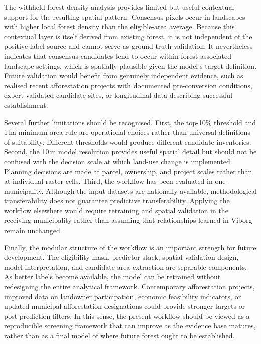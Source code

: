 \documentclass[land,article,submit,moreauthors]{Definitions/mdpi}
\begin{document}
The withheld forest-density analysis provides limited but useful contextual support for the resulting spatial pattern. Consensus pixels occur in landscapes with higher local forest density than the eligible-area average. Because this contextual layer is itself derived from existing forest, it is not independent of the positive-label source and cannot serve as ground-truth validation. It nevertheless indicates that consensus candidates tend to occur within forest-associated landscape settings, which is spatially plausible given the model's target definition. Future validation would benefit from genuinely independent evidence, such as realised recent afforestation projects with documented pre-conversion conditions, expert-validated candidate sites, or longitudinal data describing successful establishment.

Several further limitations should be recognised. First, the top-10\% threshold and 1\,ha minimum-area rule are operational choices rather than universal definitions of suitability. Different thresholds would produce different candidate inventories. Second, the 10\,m model resolution provides useful spatial detail but should not be confused with the decision scale at which land-use change is implemented. Planning decisions are made at parcel, ownership, and project scales rather than at individual raster cells. Third, the workflow has been evaluated in one municipality. Although the input datasets are nationally available, methodological transferability does not guarantee predictive transferability. Applying the workflow elsewhere would require retraining and spatial validation in the receiving municipality rather than assuming that relationships learned in Viborg remain unchanged.

Finally, the modular structure of the workflow is an important strength for future development. The eligibility mask, predictor stack, spatial validation design, model interpretation, and candidate-area extraction are separable components. As better labels become available, the model can be retrained without redesigning the entire analytical framework. Contemporary afforestation projects, improved data on landowner participation, economic feasibility indicators, or updated municipal afforestation designations could provide stronger targets or post-prediction filters. In this sense, the present workflow should be viewed as a reproducible screening framework that can improve as the evidence base matures, rather than as a final model of where future forest ought to be established.
\end{document}
